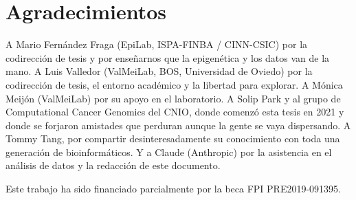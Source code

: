 \documentclass[11pt]{article}
\begin{document}
\section*{Agradecimientos}

A Mario Fern\'{a}ndez Fraga (EpiLab, ISPA-FINBA / CINN-CSIC) por la codirecci\'{o}n de tesis y por ense\~{n}arnos que la epigen\'{e}tica y los datos van de la mano. A Luis Valledor (ValMeiLab, BOS, Universidad de Oviedo) por la codirecci\'{o}n de tesis, el entorno acad\'{e}mico y la libertad para explorar. A M\'{o}nica Meij\'{o}n (ValMeiLab) por su apoyo en el laboratorio. A Solip Park y al grupo de Computational Cancer Genomics del CNIO, donde comenz\'{o} esta tesis en 2021 y donde se forjaron amistades que perduran aunque la gente se vaya dispersando. A Tommy Tang, por compartir desinteresadamente su conocimiento con toda una generaci\'{o}n de bioinform\'{a}ticos. Y a Claude (Anthropic) por la asistencia en el an\'{a}lisis de datos y la redacci\'{o}n de este documento.

Este trabajo ha sido financiado parcialmente por la beca FPI PRE2019-091395.
\end{document}
